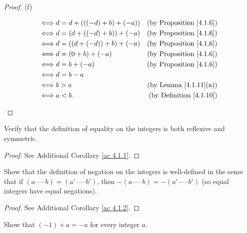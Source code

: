 \begin{proof}{(f)}
\begin{enumerate}[label=(\roman*)]
\begin{align*}
                  \iff & d = d + (((-d) + b) + (-a))     & \text{(by Proposition \ref{4.1.6})} \\
                  \iff & d = (d + ((-d) + b)) + (-a)     & \text{(by Proposition \ref{4.1.6})} \\
                  \iff & d = ((d + (-d)) + b) + (-a)     & \text{(by Proposition \ref{4.1.6})} \\
                  \iff & d = (0 + b) + (-a)              & \text{(by Proposition \ref{4.1.6})} \\
                  \iff & d = b + (-a)                    & \text{(by Proposition \ref{4.1.6})} \\
                  \iff & d = b - a                                                             \\
                  \iff & b > a                           & \text{(by Lemma \ref{4.1.11}(a))}   \\
                  \iff & a < b.                          & \text{(by Definition \ref{4.1.10})} \\
              \end{align*}
    \end{enumerate}
\end{proof}

\exercisesection

\begin{exercise}\label{ex 4.1.1}
    Verify that the definition of equality on the integers is both reflexive and symmetric.
\end{exercise}

\begin{proof}
    See Additional Corollary \ref{ac 4.1.1}.
\end{proof}

\begin{exercise}\label{ex 4.1.2}
    Show that the definition of negation on the integers is well-defined in the sense that if \((a \text{-----} b) = (a' \text{-----} b')\), then \(-(a \text{-----} b) = -(a' \text{-----} b')\)
    (so equal integers have equal negations).
\end{exercise}

\begin{proof}
    See Additional Corollary \ref{ac 4.1.2}.
\end{proof}

\begin{exercise}\label{ex 4.1.3}
    Show that \((-1) \times a = -a\) for every integer \(a\).
\end{exercise}

